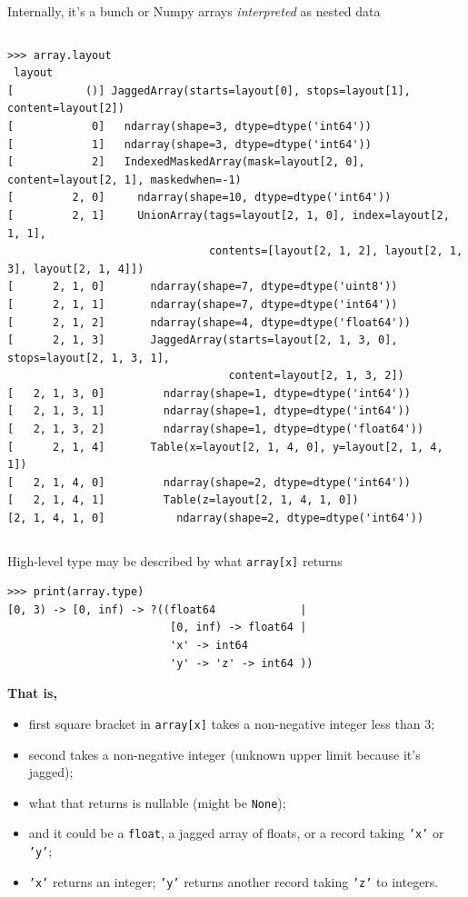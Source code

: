 \documentclass[aspectratio=169]{beamer}
\begin{document}
\begin{frame}[fragile]{Internally, it's a bunch or Numpy arrays {\it interpreted} as nested data}
\begin{columns}
\scriptsize
\begin{verbatim}
>>> array.layout
 layout
[           ()] JaggedArray(starts=layout[0], stops=layout[1], content=layout[2])
[            0]   ndarray(shape=3, dtype=dtype('int64'))
[            1]   ndarray(shape=3, dtype=dtype('int64'))
[            2]   IndexedMaskedArray(mask=layout[2, 0], content=layout[2, 1], maskedwhen=-1)
[         2, 0]     ndarray(shape=10, dtype=dtype('int64'))
[         2, 1]     UnionArray(tags=layout[2, 1, 0], index=layout[2, 1, 1],
                               contents=[layout[2, 1, 2], layout[2, 1, 3], layout[2, 1, 4]])
[      2, 1, 0]       ndarray(shape=7, dtype=dtype('uint8'))
[      2, 1, 1]       ndarray(shape=7, dtype=dtype('int64'))
[      2, 1, 2]       ndarray(shape=4, dtype=dtype('float64'))
[      2, 1, 3]       JaggedArray(starts=layout[2, 1, 3, 0], stops=layout[2, 1, 3, 1],
                                  content=layout[2, 1, 3, 2])
[   2, 1, 3, 0]         ndarray(shape=1, dtype=dtype('int64'))
[   2, 1, 3, 1]         ndarray(shape=1, dtype=dtype('int64'))
[   2, 1, 3, 2]         ndarray(shape=1, dtype=dtype('float64'))
[      2, 1, 4]       Table(x=layout[2, 1, 4, 0], y=layout[2, 1, 4, 1])
[   2, 1, 4, 0]         ndarray(shape=2, dtype=dtype('int64'))
[   2, 1, 4, 1]         Table(z=layout[2, 1, 4, 1, 0])
[2, 1, 4, 1, 0]           ndarray(shape=2, dtype=dtype('int64'))
\end{verbatim}
\end{columns}
\end{frame}

\begin{frame}[fragile]{High-level type may be described by what \texttt{array[x]} returns}
\small
\begin{verbatim}
>>> print(array.type)
[0, 3) -> [0, inf) -> ?((float64             |
                         [0, inf) -> float64 |
                         'x' -> int64
                         'y' -> 'z' -> int64 ))
\end{verbatim}

\normalsize
\vspace{0.5 cm}
{\bf That is,}
\begin{itemize}
\item first square bracket in \texttt{array[x]} takes a non-negative integer less than 3;
\item second takes a non-negative integer (unknown upper limit because it's jagged);
\item what that returns is nullable (might be \texttt{None});
\item and it could be a \texttt{float}, a jagged array of floats, or a record taking \texttt{'x'} or \texttt{'y'};
\item \texttt{'x'} returns an integer; \texttt{'y'} returns another record taking \texttt{'z'} to integers.
\end{itemize}
\end{frame}
\end{document}
